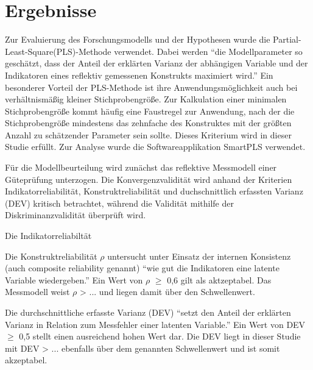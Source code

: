 \section{Ergebnisse}
\label{sec:ergebnisse}
\nocite{lohmoller2013latent}
Zur Evaluierung des Forschungsmodells und der Hypothesen wurde die Partial-Least-Square(PLS)-Methode verwendet. Dabei werden  "`die Modellparameter so geschätzt, dass der Anteil der erklärten Varianz der abhängigen Variable und der Indikatoren eines reflektiv gemessenen Konstrukts maximiert wird."'\parencite[S.16]{nitzl2010anwenderorientierte} Ein besonderer Vorteil der PLS-Methode ist ihre Anwendungsmöglichkeit auch bei verhältnismäßig kleiner Stichprobengröße. Zur Kalkulation einer minimalen Stichprobengröße kommt häufig eine Faustregel zur Anwendung, nach der die Stichprobengröße mindestens das zehnfache des Konstruktes mit der größten Anzahl zu schätzender Parameter sein sollte.\parencite[vgl.][S.394]{islam2013investigating} Dieses Kriterium wird in dieser Studie erfüllt. Zur Analyse wurde die Softwareapplikation SmartPLS verwendet. 

Für die Modellbeurteilung wird zunächst das reflektive Messmodell einer Güteprüfung unterzogen. Die Konvergenzvalidität wird anhand der Kriterien Indikatorreliabilität, Konstruktreliabilität und duchschnittlich erfassten Varianz (DEV) kritisch betrachtet, während die Validität mithilfe der Diskriminanzvalidität überprüft wird.

Die Indikatorreliabiltät 

Die Konstruktreliabilität $\rho$ untersucht unter Einsatz der internen Konsistenz (auch composite reliability genannt) "`wie gut die Indikatoren eine latente Variable wiedergeben."' Ein Wert von $\rho$ $\geq$ 0,6 gilt als aktzeptabel.\parencite[vgl.][S.212]{ringle2007beurteilung} Das Messmodell weist $\rho$ > ... und liegen damit über den Schwellenwert. 

Die durchschnittliche erfasste Varianz (DEV) "`setzt den Anteil der erklärten Varianz in Relation zum Messfehler einer latenten Variable."' \parencite[S.25]{nitzl2010anwenderorientierte} Ein Wert von DEV $\geq$ 0,5 stellt einen ausreichend hohen Wert dar. Die DEV liegt in dieser Studie mit DEV > ... ebenfalls über dem genannten Schwellenwert und ist somit akzeptabel. 

